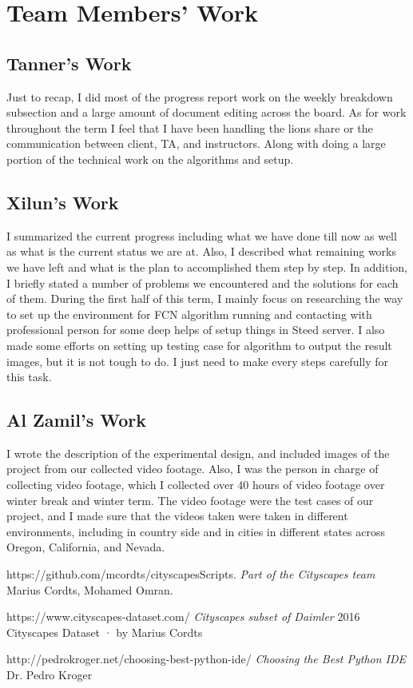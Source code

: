 \documentclass[10pt,draftclsnofoot,onecolumn,journal,compsoc]{IEEEtran}
\begin{document}
\section{Team Members' Work}
\subsection{Tanner's Work}
Just to recap, I did most of the progress report work on the weekly breakdown subsection and a large amount of document editing across the board.
As for work throughout the term I feel that I have been handling the lions share or the communication between client, TA, and instructors. Along with doing a large portion of the technical work on the algorithms and setup. 

\subsection{Xilun's Work}
I summarized the current progress including what we have done till now as well as what is the current status we are at. Also, I described what remaining works we have left and what is the plan to accomplished them step by step. 
In addition, I briefly stated a number of problems we encountered and the solutions for each of them.
During the first half of this term, I mainly focus on researching the way to set up the environment for FCN algorithm running and contacting with professional person for some deep helps of setup things in Steed server. 
I also made some efforts on setting up testing case for algorithm to output the result images, but it is not tough to do. 
I just need to make every steps carefully for this task. 

\subsection{Al Zamil's Work}
I wrote the description of the experimental design, and included images of the project from our collected video footage. 
Also, I was the person in charge of collecting video footage, which I collected over 40 hours of video footage over winter break and winter term.
The video footage were the test cases of our project, and I made sure that the videos taken were taken in different environments, including in country side and in cities in different states across Oregon, California, and Nevada.

\newpage



\begin{thebibliography}{12}

 https://github.com/mcordts/cityscapesScripts.
\textit{Part of the Cityscapes team} Marius Cordts, Mohamed Omran.

 https://www.cityscapes-dataset.com/
\textit{Cityscapes subset of Daimler} 2016 Cityscapes Dataset · by Marius Cordts 

 http://pedrokroger.net/choosing-best-python-ide/
\textit{Choosing the Best Python IDE} Dr. Pedro Kroger

\end{thebibliography}
        
\end{document}
